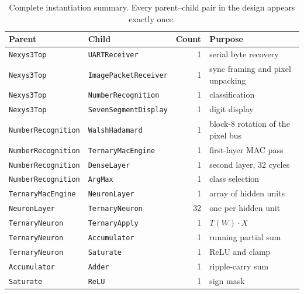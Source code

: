 \documentclass[11pt,a4paper]{article}
\begin{document}
\begin{table}[H]
\centering
\small
\caption{Complete instantiation summary. Every parent--child pair in the design
  appears exactly once.}
\label{tab:instances}
\begin{tabularx}{\linewidth}{@{}l@{\hspace{14pt}}l@{\hspace{8pt}}r@{\hspace{10pt}}L@{}}
\toprule
\textbf{Parent} & \textbf{Child} & \textbf{Count} & \textbf{Purpose} \\
\midrule
\texttt{Nexys3Top}          & \texttt{UARTReceiver}         & 1  & serial byte recovery \\
\texttt{Nexys3Top}          & \texttt{ImagePacketReceiver}  & 1  & sync framing and pixel unpacking \\
\texttt{Nexys3Top}          & \texttt{NumberRecognition}    & 1  & classification \\
\texttt{Nexys3Top}          & \texttt{SevenSegmentDisplay}  & 1  & digit display \\
\texttt{NumberRecognition}  & \texttt{WalshHadamard}        & 1  & block-8 rotation of the pixel bus \\
\texttt{NumberRecognition}  & \texttt{TernaryMacEngine}     & 1  & first-layer MAC pass \\
\texttt{NumberRecognition}  & \texttt{DenseLayer}           & 1  & second layer, 32 cycles \\
\texttt{NumberRecognition}  & \texttt{ArgMax}               & 1  & class selection \\
\texttt{TernaryMacEngine}   & \texttt{NeuronLayer}          & 1  & array of hidden units \\
\texttt{NeuronLayer}        & \texttt{TernaryNeuron}        & 32 & one per hidden unit \\
\texttt{TernaryNeuron}      & \texttt{TernaryApply}         & 1  & $T(W)\cdot X$ \\
\texttt{TernaryNeuron}      & \texttt{Accumulator}          & 1  & running partial sum \\
\texttt{TernaryNeuron}      & \texttt{Saturate}             & 1  & ReLU and clamp \\
\texttt{Accumulator}        & \texttt{Adder}                & 1  & ripple-carry sum \\
\texttt{Saturate}           & \texttt{ReLU}                 & 1  & sign mask \\
\bottomrule
\end{tabularx}
\end{table}
\end{document}
